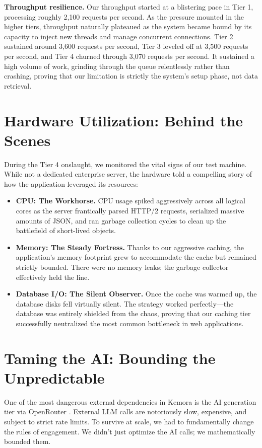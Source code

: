 \textbf{Throughput resilience.} Our throughput started at a blistering pace in Tier 1, processing roughly 2,100 requests per second. As the pressure mounted in the higher tiers, throughput naturally plateaued as the system became bound by its capacity to inject new threads and manage concurrent connections. Tier 2 sustained around 3,600 requests per second, Tier 3 leveled off at 3,500 requests per second, and Tier 4 churned through 3,070 requests per second. It sustained a high volume of work, grinding through the queue relentlessly rather than crashing, proving that our limitation is strictly the system's setup phase, not data retrieval.

\section{Hardware Utilization: Behind the Scenes}
During the Tier 4 onslaught, we monitored the vital signs of our test machine. While not a dedicated enterprise server, the hardware told a compelling story of how the application leveraged its resources:
\begin{itemize}
    \item \textbf{CPU: The Workhorse.} CPU usage spiked aggressively across all logical cores as the server frantically parsed HTTP/2 requests, serialized massive amounts of JSON, and ran garbage collection cycles to clean up the battlefield of short-lived objects.
    \item \textbf{Memory: The Steady Fortress.} Thanks to our aggressive caching, the application's memory footprint grew to accommodate the cache but remained strictly bounded. There were no memory leaks; the garbage collector effectively held the line.
    \item \textbf{Database I/O: The Silent Observer.} Once the cache was warmed up, the database disks fell virtually silent. The strategy worked perfectly—the database was entirely shielded from the chaos, proving that our caching tier successfully neutralized the most common bottleneck in web applications.
\end{itemize}

\section{Taming the AI: Bounding the Unpredictable}
One of the most dangerous external dependencies in Kemora is the AI generation tier via OpenRouter \cite{openrouter}. External LLM calls are notoriously slow, expensive, and subject to strict rate limits. To survive at scale, we had to fundamentally change the rules of engagement. We didn't just optimize the AI calls; we mathematically bounded them.

